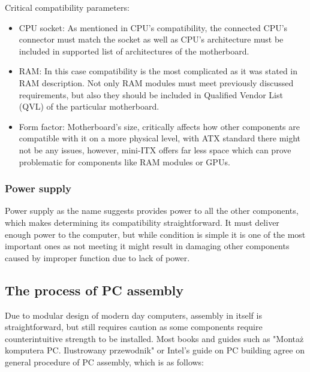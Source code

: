 Critical compatibility parameters:
\begin{itemize}
	\item CPU socket: As mentioned in CPU's compatibility, the connected CPU's connector must match the socket as well as CPU's architecture must be included in supported list of architectures of the motherboard.
	\item RAM: In this case compatibility is the most complicated as it was stated in RAM description. 
	Not only RAM modules must meet previously discussed requirements, but also they should be included in Qualified Vendor List (QVL) of the particular motherboard.
	\item Form factor: Motherboard's size, critically affects how other components are compatible with it on a more physical level, with ATX standard there might not be any issues, however, mini-ITX offers far less space which can prove problematic for components like RAM modules or GPUs.

\end{itemize}

\subsubsection{Power supply}
Power supply as the name suggests provides power to all the other components, which makes determining its compatibility straightforward.
It must deliver enough power to the computer, but while condition is simple it is one of the most important ones as not meeting it might result in damaging other components caused by improper function due to lack of power.

\subsection{The process of PC assembly}
\label{sec:pcassembly}
Due to modular design of modern day computers, assembly in itself is straightforward, but still requires caution as some components require counterintuitive strength to be installed.
Most books and guides such as "Montaż komputera {PC}. {Ilustrowany} przewodnik" \cite{chabinski_montaz_2012} or Intel's guide on PC building \cite{noauthor_how_nodate} agree on general procedure of PC assembly, which is as follows:

